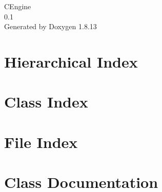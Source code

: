\documentclass[twoside]{book}
\newcommand{\+}{\discretionary{\mbox{\scriptsize$\hookleftarrow$}}{}{}}
\newcommand{\clearemptydoublepage}{%
  \newpage{\pagestyle{empty}\cleardoublepage}%
}
\begin{document}
\hypersetup{pageanchor=false,
             bookmarksnumbered=true,
             pdfencoding=unicode
            }
\begin{titlepage}
\vspace*{7cm}
\begin{center}%
{\Large C\+Engine \\[1ex]\large 0.\+1 }\\
\vspace*{1cm}
{\large Generated by Doxygen 1.8.13}\\
\end{center}
\end{titlepage}
\clearemptydoublepage
{}
\tableofcontents
\clearemptydoublepage
{}
\hypersetup{pageanchor=true}

\chapter{Hierarchical Index}

\chapter{Class Index}

\chapter{File Index}

\chapter{Class Documentation}






























\end{document}
